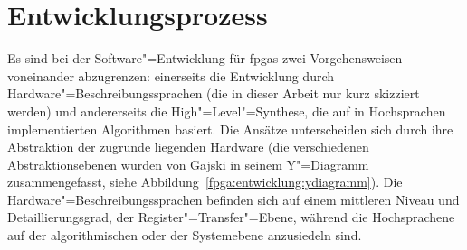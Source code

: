 \section{Entwicklungsprozess}

Es sind bei der Software"=Entwicklung für \gls{fpga}s zwei Vorgehensweisen
voneinander abzugrenzen: einerseits die Entwicklung durch
Hardware"=Beschreibungssprachen (die in dieser Arbeit nur kurz skizziert
werden) und andererseits die High"=Level"=Synthese, die auf in Hochsprachen
implementierten Algorithmen basiert. Die Ansätze unterscheiden sich durch ihre
Abstraktion der zugrunde liegenden Hardware (die verschiedenen
Abstraktionsebenen wurden von Gajski in seinem Y"=Diagramm zusammengefasst, siehe
Abbildung~\ref{fpga:entwicklung:ydiagramm}). Die Hardware"=Beschreibungssprachen
befinden sich auf einem mittleren Niveau und Detaillierungsgrad, der
Register"=Transfer"=Ebene, während die Hochsprachene auf der algorithmischen
oder der Systemebene anzusiedeln sind. \cite[vgl.][10--11]{kesel2013}

